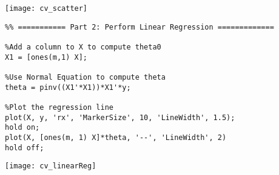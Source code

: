 \texttt{[image: cv\_scatter]}

\begin{verbatim}
%% =========== Part 2: Perform Linear Regression =============

%Add a column to X to compute theta0
X1 = [ones(m,1) X];

%Use Normal Equation to compute theta
theta = pinv((X1'*X1))*X1'*y;

%Plot the regression line
plot(X, y, 'rx', 'MarkerSize', 10, 'LineWidth', 1.5);
hold on;
plot(X, [ones(m, 1) X]*theta, '--', 'LineWidth', 2)
hold off;
\end{verbatim}

\texttt{[image: cv\_linearReg]}
